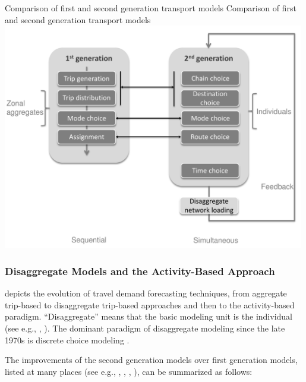\createfigure%
{Comparison of first and second generation transport models}%
{Comparison of first and second generation transport models}%
{\label{fig:g12Models}}%
{\includegraphics[width=0.99\textwidth, angle=0]{figures/g12Models.pdf}}%
{}

\subsubsection{Disaggregate Models and the Activity-Based Approach}
\citet[][Slide 4]{Bhat_unpub_1998} depicts the evolution of travel demand forecasting techniques, from aggregate trip-based to disaggregate trip-based approaches and then to the activity-based paradigm. ``Disaggregate'' means that the basic modeling unit is the individual (see e.g., \citet[][]{BenAkiva_TRR_1974, DomencichMcFadden_1975, BenAkivaLerman_1985}, \citet[][p.20]{OrtuzarWillumsen_2001}). The dominant paradigm of disaggregate modeling since the late 1970s is discrete choice modeling \citep[][p.30]{BoyceWilliams_ERSA_2003}. 

The improvements of the second generation models over first generation models, listed at many places (see e.g., \citet[][]{Axhausen_SSRL_2006}, \citep[][p.3]{SbaytiRoden_ResRep_AASHTO_2010}, \citet[][Section 2.2]{McNallyRindt_TechRep_UCI_2008}, \citep[][]{BhatKoppelman_HallRW_2003, CFD_TRB_2007}), can be summarized as follows:

